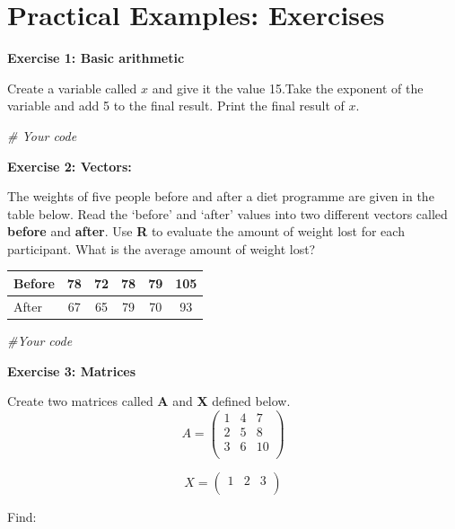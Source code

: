 \documentclass[
]{book}
\newenvironment{Shaded}{\begin{snugshade}}{\end{snugshade}}
\newcommand{\CommentTok}[1]{\textcolor[rgb]{0.56,0.35,0.01}{\textit{#1}}}
\begin{document}
\section{Practical Examples: Exercises}\label{practical-examples-exercises}

\textbf{Exercise 1: Basic arithmetic}

Create a variable called \(x\) and give it the value 15.Take the exponent of the variable and add 5 to the final result. Print the final result of \(x\).

\begin{Shaded}
\begin{Highlighting}[]
\CommentTok{\# Your code}
\end{Highlighting}
\end{Shaded}

\textbf{Exercise 2: Vectors:}

The weights of five people before and after a diet programme
are given in the table below. Read the `before' and `after' values into two different vectors called \textbf{before}
and \textbf{after}. Use \textbf{R} to evaluate the amount of weight lost for each participant. What is the average amount of weight lost?

\begin{tabular}{l|c|c|c|c|c}
\hline
Before & 78 & 72 & 78 & 79 & 105\\
\hline
After & 67 & 65 & 79 & 70 & 93\\
\hline
\end{tabular}

\begin{Shaded}
\begin{Highlighting}[]
\CommentTok{\#Your code}
\end{Highlighting}
\end{Shaded}

\textbf{Exercise 3: Matrices}

Create two matrices called \textbf{A} and \textbf{X} defined below.
\[
A=
\begin{pmatrix}
1 & 4 & 7 \\
2 & 5 & 8 \\
3 & 6 & 10 \\
\end{pmatrix}
\]

\[
X=
\begin{pmatrix}
1&2&3\\
\end{pmatrix}
\]

Find:
\end{document}
